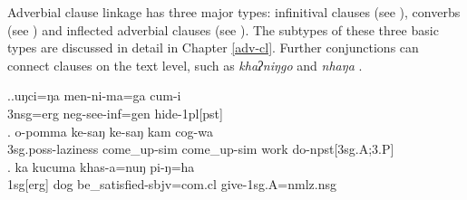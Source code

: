 Adverbial clause linkage has three major types: infinitival clauses (see \Next[a]), converbs (see \Next[b]) and inflected adverbial clauses (see \Next[c]). The subtypes of these three basic types are discussed in detail in Chapter \ref{adv-cl}. Further conjunctions can connect clauses on the text level, such as \emph{khaʔniŋgo}  and \emph{nhaŋa} .

\ex.\ag.uŋci=ŋa men-ni-ma=ga cum-i\\
{\sc 3nsg=erg} {\sc neg-}see{\sc -inf=gen} hide{\sc -1pl[pst]}\\
\bg.	o-pomma ke-saŋ ke-saŋ kam cog-wa\\
	{\sc 3sg.poss-}laziness come\_up-{\sc sim} come\_up-{\sc sim} work do{\sc -npst[3sg.A;3.P]}\\
\bg. ka kucuma khas-a=nuŋ pi-ŋ=ha\\
{\sc 1sg[erg]} dog   be\_satisfied{\sc [3sg]-sbjv=com.cl} give{\sc [pst;3.P]-1sg.A=nmlz.nsg}\\





